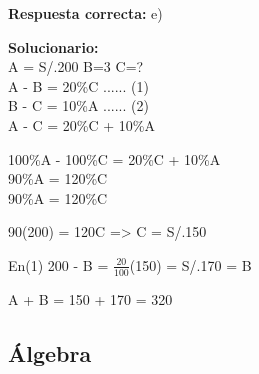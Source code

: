 \begin{enumerate}
	\textbf{Respuesta correcta:} e)
	
	\vspace{2mm}
	\textbf{Solucionario:}\\
	
	A = S/.200 B=3 C=?\\
	
	A - B = 20\%C ...... (1)\\
	B - C = 10\%A ...... (2)\\
	A - C = 20\%C + 10\%A
	
	100\%A - 100\%C = 20\%C + 10\%A\\
	90\%A = 120\%C\\
	90\%A = 120\%C
	
	90(200) = 120C => C = S/.150
	
	En(1) 200 - B =  $\displaystyle\frac{20}{100}$(150) = S/.170 = B
	
	A + B = 150 + 170 = 320
	
	
	
	\vspace{6mm}
	
\end{enumerate}



\subsection*{Álgebra}

